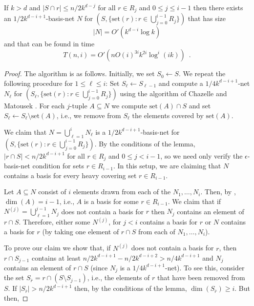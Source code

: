 \documentclass[ccfonts,lotsofwhite]{patmorin}
\newcommand{\set}{\mathrm{set}}
\newcommand{\inetsize}{k^{d-i}\log k}
\newcommand{\inettime}{nO(i)^{3i}k^{2i}\log^{i}(ik)}
\begin{document}
{\begin{lem}
If $k>d$ and $|S\cap r|\le n/2k^{d-j}$ for all $r\in R_j$ and $0\le
j\le i-1$ then there exists an $1/2k^{d-i+1}$-basis-net $N$ for
$(S,\{\set(r):r\in \bigcup_{j=0}^{i-1}R_j\})$ that has size
\[ |N| = O'(\inetsize) \]
and that can be found in time 
\[
   T(n,i) = O'(\inettime) \enspace .
\]
\end{lem}

\begin{proof}
The algorithm is as follows.  Initially, we set $S_0\gets S$.  We
repeat the following procedure for $1\le\ell\le i$: Set $S_\ell\gets
S_{\ell-1}$ and compute a $1/4k^{d-i+1}$-net $N_\ell$ for
$(S_{\ell},\{\set(r):r\in \bigcup_{j=0}^{i-1}R_j\})$ using the
algorithm of \mbox{Chazelle} and \mbox{Matousek} \cite{cmXX}. For each
$j$-tuple $A\subseteq N$ we compute $\set(A)\cap S$ and set
$S_\ell\gets S_\ell\setminus\set(A)$, i.e., we remove from $S_\ell$
the elements covered by $\set(A)$.

We claim that $N=\bigcup_{\ell=1}^i N_\ell$ is a
$1/2k^{d-i+1}$-basis-net for $(S,\{\set(r):r\in
\bigcup_{j=0}^{i-1}R_j\})$.  By the conditions of the lemma, $|r\cap
S|< n/2k^{d-i+1}$ for all $r\in R_j$ and $0\le j<i-1$, so we need only
verify the $\epsilon$-basis-net condition for sets $r\in R_{i-1}$.  In
this setup, we are claiming that $N$ contains a basis for every heavy
covering set $r\in R_{i-1}$.  

Let $A\subseteq N$ consist of $i$ elements drawn from each of the
$N_1,\ldots,N_i$.  Then, by ,
$\dim(A)=i-1$, i.e., $A$ is a basis for some $r\in R_{i-1}$.  We claim
that if $N^{(j)}=\bigcup_{\ell=1}^{j-1} N_j$ does not contain a basis
for $r$ then $N_j$ contains an element of $r\cap S$.  Therefore,
either some $N^{(j)}$, for $j<i$ contains a basis for $r$ or $N$
contains a basis for $r$ (by taking one element of $r\cap S$ from each
of $N_1,\ldots,N_i$).

\newcommand{\sbarr}{S_{\overline{r}}}

To prove our claim we show that, if $N^{(j)}$ does not contain a basis
for $r$, then $r\cap S_{j-1}$ contains at least
$n/2k^{d-i+1}-n/2k^{d-i+2}>n/4k^{d-i+1}$ and $N_j$ contains an
element of $r\cap S$ (since $N_j$ is a $1/4k^{d-i+1}$-net).  To see
this, consider the set $\sbarr=r\cap (S\setminus S_{j-1})$, i.e., the
elements of $r$ that have been removed from $S$.  If
$|\sbarr|>n/2k^{d-i+1}$ then, by the conditions of the lemma,
$\dim(\sbarr)\ge i$.  But then, 

\end{proof}
}
\end{document}
